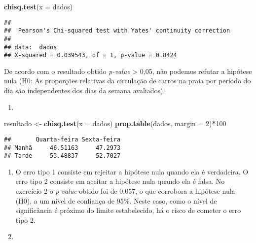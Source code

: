 \documentclass[14pt,titlepage, oneside, openany, a4paper]{book}
\newenvironment{Shaded}{\begin{snugshade}}{\end{snugshade}}
\newcommand{\DataTypeTok}[1]{\textcolor[rgb]{0.13,0.29,0.53}{#1}}
\newcommand{\DecValTok}[1]{\textcolor[rgb]{0.00,0.00,0.81}{#1}}
\newcommand{\KeywordTok}[1]{\textcolor[rgb]{0.13,0.29,0.53}{\textbf{#1}}}
\newcommand{\NormalTok}[1]{#1}
\newcommand{\OperatorTok}[1]{\textcolor[rgb]{0.81,0.36,0.00}{\textbf{#1}}}
\newcommand{\StringTok}[1]{\textcolor[rgb]{0.31,0.60,0.02}{#1}}
\begin{document}
\begin{Shaded}
\begin{Highlighting}[]
\KeywordTok{chisq.test}\NormalTok{(}\DataTypeTok{x =}\NormalTok{ dados)}
\end{Highlighting}
\end{Shaded}

\begin{verbatim}
## 
##  Pearson's Chi-squared test with Yates' continuity correction
## 
## data:  dados
## X-squared = 0.039543, df = 1, p-value = 0.8424
\end{verbatim}

De acordo com o resultado obtido \emph{p-value} \textgreater{} 0,05, não podemos refutar a hipótese nula (H0: As proporções relativas da circulação de carros na praia por período do dia são independentes dos dias da semana avaliados).

\begin{enumerate}
\def\labelenumi{\arabic{enumi})}
\setcounter{enumi}{2}
\item
\end{enumerate}

\begin{Shaded}
\begin{Highlighting}[]
\NormalTok{resultado <-}\StringTok{ }\KeywordTok{chisq.test}\NormalTok{(}\DataTypeTok{x =}\NormalTok{ dados)}
\KeywordTok{prop.table}\NormalTok{(dados, }\DataTypeTok{margin =} \DecValTok{2}\NormalTok{)}\OperatorTok{*}\DecValTok{100}
\end{Highlighting}
\end{Shaded}

\begin{verbatim}
##       Quarta-feira Sexta-feira
## Manhã     46.51163     47.2973
## Tarde     53.48837     52.7027
\end{verbatim}

\begin{enumerate}
\def\labelenumi{\arabic{enumi})}
\setcounter{enumi}{3}
\item
  O erro tipo 1 consiste em rejeitar a hipótese nula quando ela é verdadeira. O erro tipo 2 consiste em aceitar a hipótese nula quando ela é falsa.
  No exercício 2 o \emph{p-value} obtido foi de 0,057, o que corrobora a hipótese nula (H0), a um nível de confiança de 95\%. Neste caso, como o nível de significância é próximo do limite estabelecido, há o risco de cometer o erro tipo 2.
\item
\end{enumerate}
\end{document}
